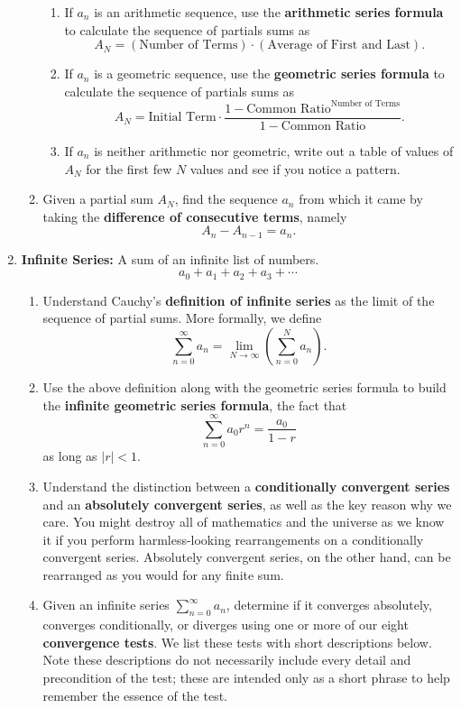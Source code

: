 \begin{enumerate}
\begin{enumerate}
\begin{enumerate}
\item If $a_n$ is an arithmetic sequence, use the {\bf arithmetic series formula} to calculate the sequence of partials sums as $$A_N=\left(\text{Number of Terms}\right)\cdot\left(\text{Average of First and Last}\right).$$
\item If $a_n$ is a geometric sequence, use the {\bf geometric series formula} to calculate the sequence of partials sums as $$A_N=\text{Initial Term}\cdot\frac{1-\text{Common Ratio}^{\text{Number of Terms}}}{1-\text{Common Ratio}}.$$
\item If $a_n$ is neither arithmetic nor geometric, write out a table of values of $A_N$ for the first few $N$ values and see if you notice a pattern.
\end{enumerate}
\item Given a partial sum $A_N$, find the sequence $a_n$ from which it came by taking the {\bf difference of consecutive terms}, namely
$$A_{n}-A_{n-1}=a_n. $$
\end{enumerate}
\item {\bf Infinite Series:} A sum of an infinite list of numbers. $$a_0+a_1+a_2+a_3+\cdots  $$
\begin{enumerate}
\item Understand Cauchy's {\bf definition of infinite series} as the limit of the sequence of partial sums.  More formally, we define $$\sum_{n=0}^\infty a_n=\lim_{N\to\infty}\left(\sum_{n=0}^Na_n\right).$$
\item Use the above definition along with the geometric series formula to build the {\bf infinite geometric series formula}, the fact that $$\sum_{n=0}^\infty a_0r^n = \frac{a_0}{1-r} $$ as long as $|r|<1$.
\item Understand the distinction between a {\bf conditionally convergent series} and an {\bf absolutely convergent series}, as well as the key reason why we care. You might destroy all of mathematics and the universe as we know it if you perform harmless-looking rearrangements on a conditionally convergent series.  Absolutely convergent series, on the other hand, can be rearranged as you would for any finite sum. 
\item Given an infinite series $\sum_{n=0}^\infty a_n $, determine if it converges absolutely, converges conditionally, or diverges using one or more of our eight {\bf convergence tests}.  We list these tests with short descriptions below. Note these descriptions do not necessarily include every detail and precondition of the test; these are intended only as a short phrase to help remember the essence of the test.  

\end{enumerate}
\end{enumerate}

